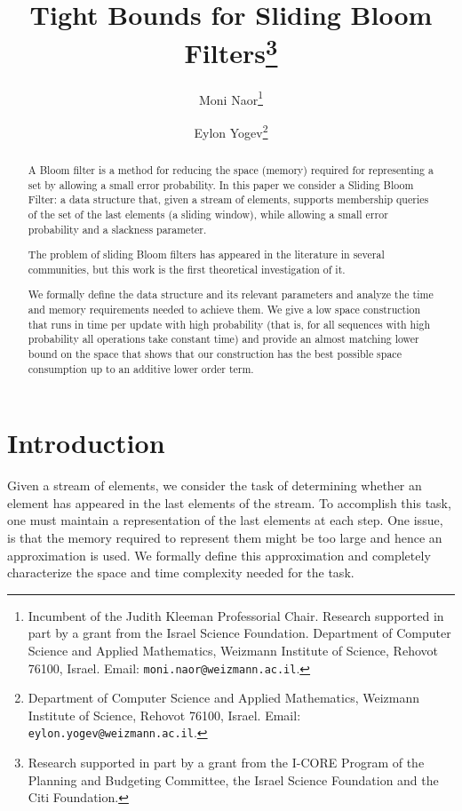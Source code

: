 \documentclass[11pt]{article}
\begin{document}
\title{Tight Bounds for Sliding Bloom Filters\footnote{Research supported in part by a grant from the I-CORE Program of the Planning and Budgeting Committee, the Israel Science Foundation and the Citi Foundation.}}
\author{
    Moni Naor\footnotemark[\value{footnote}]\thanks{Incumbent of the Judith
        Kleeman Professorial Chair. Research supported in part by a grant from the
        Israel Science Foundation. Department of Computer Science and
                Applied Mathematics, Weizmann Institute of Science, Rehovot 76100,
                Israel. Email: \texttt{moni.naor@weizmann.ac.il}.}
  \and
    Eylon Yogev\thanks{Department of Computer Science and
        Applied Mathematics, Weizmann Institute of Science, Rehovot 76100,
        Israel. Email: \texttt{eylon.yogev@weizmann.ac.il}.}
}


\pagestyle{plain}

\maketitle

\begin{abstract}
A Bloom filter is a method for reducing the space (memory) required for representing a set by allowing a small error probability. In this paper we consider a Sliding Bloom Filter: a data structure that, given a stream of elements, supports membership queries of the set of the last  elements (a sliding window), while allowing a small error probability and a slackness parameter. 

The problem of sliding Bloom filters has appeared in the literature in several communities, but this work is the first theoretical investigation of it. 

We formally define the data structure and its relevant parameters and analyze the time and memory requirements needed to achieve them. We give a low space construction that runs in  time per update with high probability (that is, for all sequences with high probability all operations take constant time) and provide an almost matching lower bound on the space that shows that our construction has the best possible space consumption up to an additive lower order term.
\end{abstract}

\section{Introduction}
Given a stream of elements, we consider the task of determining whether an element has appeared in the last  elements of the stream. To accomplish this task, one must maintain a representation of the last  elements at each step. One issue, is that the memory required to represent them might be too large and hence an approximation is used. We formally define this approximation and completely characterize the space and time complexity needed for the task.
\end{document}
